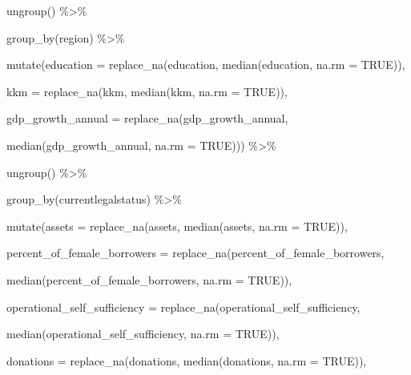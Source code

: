 \documentclass[a4paper,nobind]{templates/ociamthesis}
\newenvironment{Shaded}{\begin{snugshade}}{\end{snugshade}}
\newcommand{\AttributeTok}[1]{\textcolor[rgb]{0.77,0.63,0.00}{#1}}
\newcommand{\ConstantTok}[1]{\textcolor[rgb]{0.00,0.00,0.00}{#1}}
\newcommand{\FunctionTok}[1]{\textcolor[rgb]{0.00,0.00,0.00}{#1}}
\newcommand{\NormalTok}[1]{#1}
\newcommand{\SpecialCharTok}[1]{\textcolor[rgb]{0.00,0.00,0.00}{#1}}
\renewenvironment{Shaded}
{
  \vspace{10pt}%
  \begin{snugshade}%
}{%
  \end{snugshade}%
  \vspace{8pt}%
}
\begin{document}
\begin{Shaded}
\begin{Highlighting}[]
  \FunctionTok{ungroup}\NormalTok{() }\SpecialCharTok{\%\textgreater{}\%} 
  
  \FunctionTok{group\_by}\NormalTok{(region) }\SpecialCharTok{\%\textgreater{}\%} 
  
  \FunctionTok{mutate}\NormalTok{(}\AttributeTok{education =} \FunctionTok{replace\_na}\NormalTok{(education, }\FunctionTok{median}\NormalTok{(education, }\AttributeTok{na.rm =} \ConstantTok{TRUE}\NormalTok{)),}
         
         \AttributeTok{kkm =} \FunctionTok{replace\_na}\NormalTok{(kkm, }\FunctionTok{median}\NormalTok{(kkm, }\AttributeTok{na.rm =} \ConstantTok{TRUE}\NormalTok{)),}
         
         \AttributeTok{gdp\_growth\_annual =} \FunctionTok{replace\_na}\NormalTok{(gdp\_growth\_annual, }
                                        
         \FunctionTok{median}\NormalTok{(gdp\_growth\_annual, }\AttributeTok{na.rm =} \ConstantTok{TRUE}\NormalTok{))) }\SpecialCharTok{\%\textgreater{}\%} 
  
  \FunctionTok{ungroup}\NormalTok{() }\SpecialCharTok{\%\textgreater{}\%} 
  
  \FunctionTok{group\_by}\NormalTok{(currentlegalstatus) }\SpecialCharTok{\%\textgreater{}\%} 
  
  \FunctionTok{mutate}\NormalTok{(}\AttributeTok{assets =} \FunctionTok{replace\_na}\NormalTok{(assets, }\FunctionTok{median}\NormalTok{(assets, }\AttributeTok{na.rm =} \ConstantTok{TRUE}\NormalTok{)), }
         
         \AttributeTok{percent\_of\_female\_borrowers =} \FunctionTok{replace\_na}\NormalTok{(percent\_of\_female\_borrowers, }
                                                  
                        \FunctionTok{median}\NormalTok{(percent\_of\_female\_borrowers, }\AttributeTok{na.rm =} \ConstantTok{TRUE}\NormalTok{)),}
         
         \AttributeTok{operational\_self\_sufficiency =} \FunctionTok{replace\_na}\NormalTok{(operational\_self\_sufficiency, }
                                                   
                        \FunctionTok{median}\NormalTok{(operational\_self\_sufficiency, }\AttributeTok{na.rm =} \ConstantTok{TRUE}\NormalTok{)),}
         
         \AttributeTok{donations =} \FunctionTok{replace\_na}\NormalTok{(donations, }\FunctionTok{median}\NormalTok{(donations, }\AttributeTok{na.rm =} \ConstantTok{TRUE}\NormalTok{)),}
         

\end{Highlighting}
\end{Shaded}
\end{document}
